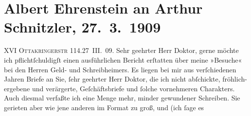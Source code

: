 

         
         \renewcommand{\erwaehntePersonen}{Personen: Raoul Auernheimer, Albert Ehrenstein, Karl Glossy, Felix von Oppenheimer}
         \renewcommand{\erwaehnteOrte}{Orte: Ottakringerstraße, Wien}
         \renewcommand{\erwaehnteWerke}{}
               \section[Albert Ehrenstein an Arthur Schnitzler, 27. 3. 1909]{ Albert Ehrenstein an Arthur Schnitzler, 27. 3. 1909}\nopagebreak{}\rehead{ }\begin{ledgroupsized}[t]{13cm}\normalsize\beginnumbering{} \toendnotes[C]{\smallbreak\pagebreak[2]} 
\toendnotes[C]{\smallbreak}\pstart
           {\pb}XVI \textsc{Ottakringerstr}
                        114.\hfill 27 III. 09.\pend
           \pstart{}Sehr geehrter Herr Doktor,\pend\pstart
           gerne möchte ich pflichtſchuldigſt einen ausführlichen Bericht erſtatten über meine
               »Besuche« bei den Herren Geld- und Schreibheimers. Es liegen bei mir aus verſchiedenen Jahren Briefe
               an Sie, ſehr geehrter Herr Doktor, die ich nicht abſchickte, fröhlich-ergebene und
               verärgerte, Geſchäftsbriefe und ſolche vornehmeren Charakters. Auch diesmal verfaßte
               ich eine Menge mehr, minder gewundener Schreiben. Sie gerieten aber wie jene anderen
               im Format zu groß, und (ich ſage es \label{K_L01835-1v}
\end{ledgroupsized}
